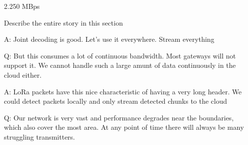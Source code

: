 2.250 MBps

{\color{blue} Describe the entire story in this section}

A: Joint decoding is good. Let's use it everywhere. Stream everything

Q: But this consumes a lot of continuous bandwidth. Most gateways will not support it. We cannot handle such a large amunt of data continuously in the cloud either.

A: LoRa packets have this nice characteristic of having a very long header. We could detect packets locally and only stream detected chunks to the cloud

Q: Our network is very vast and performance degrades near the boundaries, which also cover the most area. At any point of time there will always be many struggling transmitters.
